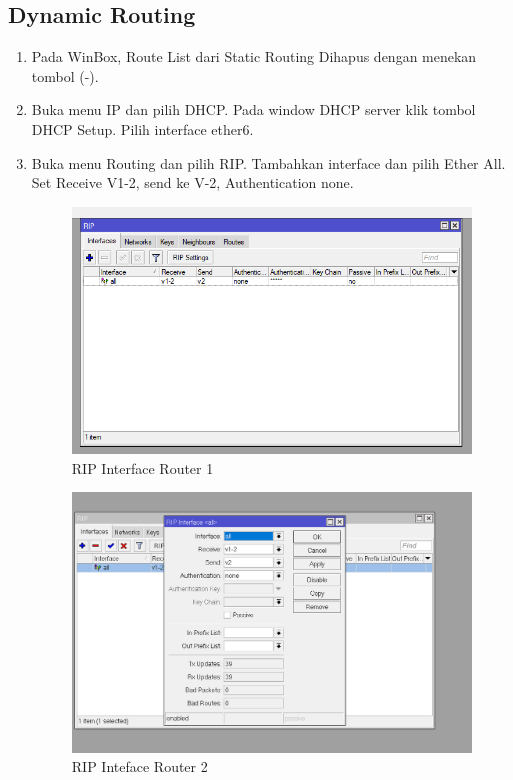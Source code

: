 \subsection{Dynamic Routing}
\begin{enumerate}

    \item Pada WinBox, Route List dari Static Routing Dihapus dengan menekan tombol (-).

    \item Buka menu IP dan pilih DHCP. Pada window DHCP server klik tombol DHCP Setup. Pilih interface ether6.

    \item Buka menu Routing dan pilih RIP. Tambahkan interface dan pilih Ether All. Set Receive V1-2, send ke V-2, Authentication none.
        \begin{figure}[H]
            \centering
            \includegraphics[width=0.5\linewidth]{P1/img/rip interfaces.png}
            \caption{RIP Interface Router 1}
            \label{fig:enter-label}
        \end{figure}
        \begin{figure}[H]
            \centering
            \includegraphics[width=0.5\linewidth]{P1/img/rip interfaces 2.png}
            \caption{RIP Inteface Router 2}
            \label{fig:enter-label}
        \end{figure}


\end{enumerate}
